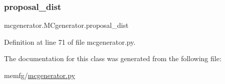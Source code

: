 \subsubsection{\texorpdfstring{proposal\+\_\+dist}{proposal\_dist}}
{\footnotesize\ttfamily mcgenerator.\+M\+Cgenerator.\+proposal\+\_\+dist}



Definition at line 71 of file mcgenerator.\+py.



The documentation for this class was generated from the following file\+:\begin{DoxyCompactItemize}
\item 
memfg/\hyperlink{mcgenerator_8py}{mcgenerator.\+py}\end{DoxyCompactItemize}
